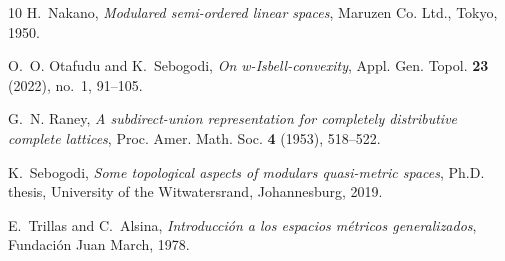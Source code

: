 \documentclass[11pt,a4paper]{amsart}
\theoremstyle{definition}
\begin{document}
\begin{thebibliography}{10}
		H.~Nakano, \emph{Modulared semi-ordered linear spaces}, Maruzen Co. Ltd.,
		Tokyo, 1950.
		
		O.~O. Otafudu and K.~Sebogodi, \emph{On w-{I}sbell-convexity}, Appl. Gen.
		Topol. \textbf{23} (2022), no.~1, 91–105.
		
		G.~N. Raney, \emph{A subdirect-union representation for completely distributive
			complete lattices}, Proc. Amer. Math. Soc. \textbf{4} (1953), 518--522.
		
		K.~Sebogodi, \emph{Some topological aspects of modulars quasi-metric spaces},
		Ph.D. thesis, University of the Witwatersrand, Johannesburg, 2019.
		
		E.~Trillas and C.~Alsina, \emph{Introducci\'on a los espacios m\'etricos
			generalizados}, Fundaci\'on Juan March, 1978.
		
	\end{thebibliography}
	
	
\end{document}

